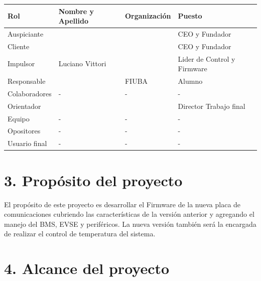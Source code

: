\documentclass[
11pt, %
codirector, %
]{charter}
\begin{document}
\begin{table}[ht]
	\begin{tabularx}{\linewidth}{@{}|l|X|X|l|@{}}
		\hline
		\rowcolor[HTML]{C0C0C0}
		Rol           & Nombre y Apellido & Organización    & Puesto                      \\ \hline
		Auspiciante   & \clientename      & \empclientename & CEO y Fundador              \\ \hline
		Cliente       & \clientename      & \empclientename & CEO y Fundador              \\ \hline
		Impulsor      & Luciano Vittori   & \empclientename & Lider de Control y Firmware \\ \hline
		Responsable   & \authorname       & FIUBA           & Alumno                      \\ \hline
		Colaboradores & -                 & -               & -                           \\ \hline
		Orientador    & \supname          & \pertesupname   & Director Trabajo final      \\ \hline
		Equipo        & -                 & -               & -                           \\ \hline
		Opositores    & -                 & -               & -                           \\ \hline
		Usuario final & -                 & -               & -                           \\ \hline
	\end{tabularx}
\end{table}





\section{3. Propósito del proyecto}
\label{sec:proposito}

El propósito de este proyecto es desarrollar el Firmware de la nueva placa de comunicaciones cubriendo las características de la versión anterior y agregando el manejo del BMS, EVSE y periféricos.
La nueva versión también será la encargada de realizar el control de temperatura del sistema.

\section{4. Alcance del proyecto}
\label{sec:alcance}
\end{document}
